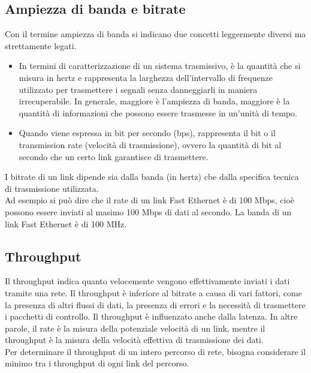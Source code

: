 \documentclass[12pt]{report}
\begin{document}
	\subsection{Ampiezza di banda e bitrate}
	Con il termine ampiezza di banda si indicano due concetti leggermente diversi ma strettamente legati.
	\begin{itemize}
		\item In termini di caratterizzazione di un sistema trasmissivo, è la quantità che si misura in hertz e rappresenta la larghezza dell'intervallo di frequenze utilizzato per trasmettere i segnali senza danneggiarli in maniera irrecuperabile. In generale, maggiore è l'ampiezza di banda, maggiore è la quantità di informazioni che possono essere trasmesse in un'unità di tempo.
		\item Quando viene espressa in bit per secondo (bps), rappresenta il bit o il transmission rate (velocità di trasmissione), ovvero la quantità di bit al secondo che un certo link garantisce di trasmettere.
	\end{itemize}
	I bitrate di un link dipende sia dalla banda (in hertz) cbe dalla specifica tecnica di trasmissione utilizzata.
	\vspace{\baselineskip}\\
	Ad esempio si può dire che il rate di un link Fast Ethernet è di 100 Mbps, cioè possono essere inviati al masimo 100 Mbps di dati al secondo. La banda di un link Fast Ethernet è di 100 MHz.

	\subsection{Throughput}
	Il throughput indica quanto velocemente vengono effettivamente inviati i dati tramite una rete. Il throughput è inferiore al bitrate a causa di vari fattori, come la presenza di altri flussi di dati, la presenza di errori e la necessità di trasmettere i pacchetti di controllo. Il throughput è influenzato anche dalla latenza. In altre parole, il rate è la misura della potenziale velocità di un link, mentre il throughput è la misura della velocità effettiva di trasmissione dei dati.
	\vspace{\baselineskip}\\
	Per determinare il throughput di un intero percorso di rete, bisogna considerare il minimo tra i throughput di ogni link del percorso.
\end{document}
